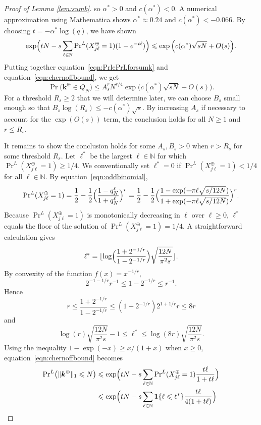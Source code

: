 \documentclass{article}
\theoremstyle{definition}
\renewcommand{\leq}{\leqslant}
\renewcommand{\geq}{\geqslant}
\newcommand{\natu}{\mathbb{N}}
\newcommand{\bsk}{\boldsymbol{k}}
\newcommand{\bsone}{\boldsymbol{1}}
\begin{document}
\begin{proof}[Proof of Lemma \ref{lem:sumk}]
     so $\alpha^*>0$ and $c(\alpha^*)<0$. A numerical approximation using Mathematica shows $\alpha^*\approx 0.24$ and $c(\alpha^*)< -0.066$.
By choosing $t=-\alpha^*\log(q)$, we have shown
    $$\exp\Bigl(tN-s\sum_{\ell\in\natu}{\textstyle\Pr}^L(X^\oplus_{j\ell}=1)(1-e^{-t\ell })\Bigr)\leq \exp\Big(c(\alpha^*)\sqrt{sN}+O(s)\Big).$$
    Putting together equation~\eqref{eqn:PrlePrLforsumk} and equation~\eqref{eqn:chernoffbound}, we get
    $$\Pr\big(\bsk^\oplus\in Q_N\big)\leq A^r_sN^{r/4}\exp\Big(c(\alpha^*)\sqrt{sN}+O(s)\Big).$$
    For a threshold $R_s\geq 2$ that we will determine later, we can choose $B_s$ small enough so that $B_s \log(R_s)\leq -c(\alpha^*)\sqrt{s}$. By increasing $A_s$ if necessary to account for the $\exp(O(s))$ term, the conclusion holds for all $N\geq 1$ and $r\leq R_s$.

        It remains to show the conclusion holds for some $A_s, B_s>0$ when $r> R_s$ for some threshold $R_s$. Let $\ell^*$ be the largest $\ell\in \natu$ for which ${\textstyle\Pr}^L(X^\oplus_{j\ell}=1)\geq 1/4$. We conventionally set $\ell^*=0$ if ${\textstyle\Pr}^L(X^\oplus_{j\ell}=1)< 1/4$ for all $\ell\in\natu$. By equation~\eqref{eqn:oddbinomial},
    $${\textstyle\Pr}^L(X^\oplus_{j\ell}=1)=\frac{1}{2}-\frac{1}{2}\Bigl(\frac{1-q_N^\ell}{1+q_N^\ell}\Bigr)^r=\frac{1}{2}-\frac{1}{2}\Bigl(\frac{1-\exp(-\pi\ell\sqrt{s/12N})}{1+\exp(-\pi\ell\sqrt{s/12N})}\Bigr)^r.$$
    Because ${\textstyle\Pr}^L(X^\oplus_{j\ell}=1)$ is monotonically decreasing in $\ell$ over $\ell\geq 0$, $\ell^*$ equals the floor of the solution of ${\textstyle\Pr}^L(X^\oplus_{j\ell}=1)=1/4$. A straightforward calculation gives
    $$\ell^*=\lfloor\log\Bigl(\frac{1+2^{-1/r}}{1-2^{-1/r}}\Bigr)\sqrt{\frac{12N}{\pi^2 s}}\rfloor.$$
    By convexity of the function $f(x)=x^{-1/r}$,
    $$2^{-1-1/r}r^{-1}\leq 1-2^{-1/r}\leq r^{-1}.$$
    Hence
    $$r\leq\frac{1+2^{-1/r}}{1-2^{-1/r}}\leq (1+2^{-1/r})2^{1+1/r}r\leq 8r$$
    and
    \begin{equation}\label{eqn:lstarbound}
      \log(r)\sqrt{\frac{12N}{\pi^2 s}}-1\leq \ell^*\leq \log(8r)\sqrt{\frac{12N}{\pi^2 s}}.  
    \end{equation}
    Using the inequality $1-\exp(-x)\geq x/(1+x)$ when $x\geq 0$, equation~\eqref{eqn:chernoffbound} becomes
    \begin{align}\label{eqn:chernoffbound2}
        {\textstyle\Pr}^L\big(\Vert\bsk^\oplus\Vert_1\leq N\big)&\leq \exp\Bigl(tN-s\sum_{\ell\in\natu}{\textstyle\Pr}^L(X^\oplus_{j\ell}=1)\frac{t\ell}{1+t\ell}\Bigr)\\
    &\leq \exp\Bigl(tN-s\sum_{\ell\in \natu}\bsone\{\ell\leq\ell^*\}\frac{t\ell}{4(1+t\ell)}\Bigr)\nonumber\\

\end{align}
\end{proof}
\end{document}
